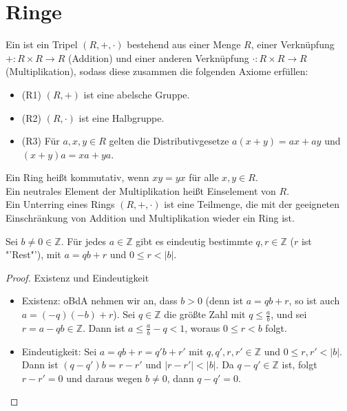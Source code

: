 \section{Ringe}

\begin{definition}[Ring]
	Ein  ist ein Tripel $(R,+,\cdot)$ bestehend aus einer Menge
	$R$, einer Verknüpfung $+: R \times R \to R$ (Addition) und einer anderen Verknüpfung
	$\cdot: R \times R \to R$ (Multiplikation), sodass diese zusammen die folgenden Axiome 
	erfüllen:
	\begin{itemize}
		\item (R1) $(R,+)$ ist eine abelsche Gruppe.
		\item (R2) $(R,\cdot)$ ist eine Halbgruppe.
		\item (R3) Für $a,x,y \in R$ gelten die Distributivgesetze $a(x+y)=ax+ay$ und $(x+y)a=xa+ya$.
	\end{itemize}
	Ein Ring heißt kommutativ, wenn $xy=yx$ für alle $x,y \in R$.\\
	Ein neutrales Element der Multiplikation heißt Einselement von $R$.\\
	Ein Unterring eines Rings $(R,+,\cdot)$ ist eine Teilmenge, die mit der geeigneten
	Einschränkung von Addition und Multiplikation wieder ein Ring ist.
\end{definition}

\begin{theorem}
	Sei $b \neq 0 \in \mathbb{Z}$. Für jedes $a \in \mathbb{Z}$ gibt es 
	eindeutig bestimmte $q,r \in \mathbb{Z}$ ($r$ ist "'Rest"'), mit $a=qb+r$ und $0 \le r < \vert b\vert$.
\end{theorem}
\begin{proof}
	Existenz und Eindeutigkeit
	\begin{itemize}
		\item Existenz: oBdA nehmen wir an, dass $b>0$ (denn ist $a=qb+r$, so ist auch $a=(-q)(-b)+r$). Sei $q \in
		\mathbb{Z}$ die größte Zahl mit $q \le \frac{a}{b}$, und sei $r=a-qb \in \mathbb{Z}$. Dann ist
		$a \le \frac{a}{b}-q < 1$, woraus $0 \le r < b$ folgt.
		\item Eindeutigkeit: Sei $a=qb+r=q'b+r'$ mit $q,q',r,r' \in \mathbb{Z}$ und $0 \le r,r' < |b|$. Dann ist
		$(q-q')b=r-r'$ und $|r-r'|<|b|$. Da $q-q' \in \mathbb{Z}$ ist, folgt $r-r'=0$ und daraus wegen 
		$b \neq 0$, dann $q-q'=0$.
	\end{itemize}
\end{proof}

